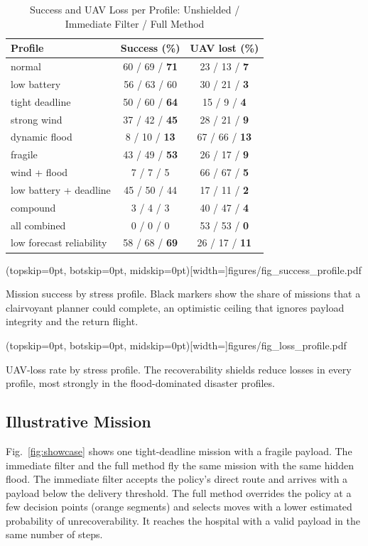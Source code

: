 \documentclass{ieeeaccess}
\newcommand{\widecap}[1]{\parbox[t]{0.89\textwidth}{\raggedright #1}}
\begin{document}
\begin{table}[t]
\caption{Success and UAV Loss per Profile: Unshielded / Immediate Filter / Full Method}
\label{tab:profile}
\setlength{\tabcolsep}{3pt}
\begin{tabular}{@{}lcc@{}}
\toprule
Profile & Success (\%) & UAV lost (\%) \\
\midrule
normal & 60 / 69 / \textbf{71} & 23 / 13 / \textbf{7} \\
low battery & 56 / 63 / 60 & 30 / 21 / \textbf{3} \\
tight deadline & 50 / 60 / \textbf{64} & 15 / 9 / \textbf{4} \\
strong wind & 37 / 42 / \textbf{45} & 28 / 21 / \textbf{9} \\
dynamic flood & 8 / 10 / \textbf{13} & 67 / 66 / \textbf{13} \\
fragile & 43 / 49 / \textbf{53} & 26 / 17 / \textbf{9} \\
wind + flood & 7 / 7 / 5 & 66 / 67 / \textbf{5} \\
low battery + deadline & 45 / 50 / 44 & 17 / 11 / \textbf{2} \\
compound & 3 / 4 / 3 & 40 / 47 / \textbf{4} \\
all combined & 0 / 0 / 0 & 53 / 53 / \textbf{0} \\
low forecast reliability & 58 / 68 / \textbf{69} & 26 / 17 / \textbf{11} \\
\bottomrule
\end{tabular}
\end{table}

\Figure[t!](topskip=0pt, botskip=0pt, midskip=0pt)[width=\textwidth]{figures/fig_success_profile.pdf}
{\widecap{Mission success by stress profile. Black markers show the share of missions that a clairvoyant planner could complete, an optimistic ceiling that ignores payload integrity and the return flight.}\label{fig:success}}

\Figure[t!](topskip=0pt, botskip=0pt, midskip=0pt)[width=\textwidth]{figures/fig_loss_profile.pdf}
{\widecap{UAV-loss rate by stress profile. The recoverability shields reduce losses in every profile, most strongly in the flood-dominated disaster profiles.}\label{fig:loss}}

\subsection{Illustrative Mission}
Fig.~\ref{fig:showcase} shows one tight-deadline mission with a fragile payload. The immediate filter and the full method fly the same mission with the same hidden flood. The immediate filter accepts the policy's direct route and arrives with a payload below the delivery threshold. The full method overrides the policy at a few decision points (orange segments) and selects moves with a lower estimated probability of unrecoverability. It reaches the hospital with a valid payload in the same number of steps.
\end{document}
